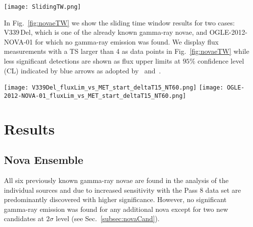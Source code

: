 \documentclass{aa} %
\newcommand{\onepic}{0.4}
\begin{document}
\begin{figure*}[htb!]
\begin{center}
\texttt{[image: SlidingTW.png]}
\noindent
\caption{\small Sketch of the sliding time window analysis. The start time of the time window is shifted in 2 days steps from 20 days before the peak time to 20 days after the peak time, i.e. the time window center moves from $-12.5$ to $27.5$\,days relative to the peak time.}
\label{fig:slidingTW}
\end{center}
\end{figure*}

In Fig.~\ref{fig:novaeTW} we show the sliding time window results for two cases: V339\,Del, which is one of the already known gamma-ray novae, and OGLE-2012-NOVA-01 for which no gamma-ray emission was found. We display flux measurements with a TS larger than 4 as data points in Fig.~\ref{fig:novaeTW} while less significant detections are shown as flux upper limits at $95\%$ confidence level (CL) indicated by blue arrows as adopted by~\citet{2014Sci...345..554A} and~\citet{2016ApJ...826..142C}. 

\begin{figure*}[htb!]
\begin{center}
\texttt{[image: V339Del\_fluxLim\_vs\_MET\_start\_deltaT15\_NT60.png]}
\texttt{[image: OGLE-2012-NOVA-01\_fluxLim\_vs\_MET\_start\_deltaT15\_NT60.png]}
\noindent
\caption{\small Measured flux ($TS>4$, shown in red) above 100 MeV and flux upper limits (shown in blue) for the various sliding time windows for the two novae, V339\,Del (left) and OGLE-2012-NOVA-01 (right). V339 Del is one of the previously known gamma-ray novae, while no gamma-ray emission was found for OGLE-2012-NOVA-01.}
\label{fig:novaeTW}
\end{center}
\end{figure*}



\section{Results}
\label{sec:res}

\subsection{Nova Ensemble}

All six previously known gamma-ray novae are found in the analysis of the individual sources and due to increased sensitivity with the Pass 8 data set are predominantly discovered with higher significance. However, no significant gamma-ray emission was found for any additional nova except for two new candidates at $2\sigma$  level (see Sec.~\ref{subsec:novaCand}). 
\end{document}
